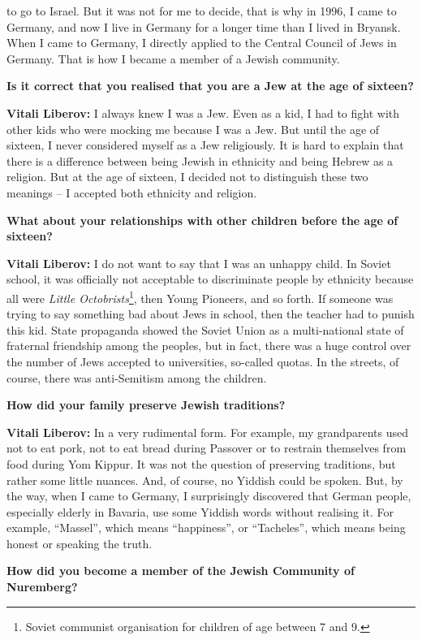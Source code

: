 to go to Israel. But it was not for me to decide, that is why in 1996, I came to Germany, and now I live in Germany for a longer time than I lived in Bryansk. When I came to Germany, I directly applied to the Central Council of Jews in Germany. That is how I became a member of a Jewish community.  

\textbf{Is it correct that you realised that you are a Jew at the age of sixteen?} 

\textbf{Vitali Liberov:} I always knew I was a Jew. Even as a kid, I had to fight with other kids who were mocking me because I was a Jew. But until the age of sixteen, I never considered myself as a Jew religiously. It is hard to explain that there is a difference between being Jewish in ethnicity and being Hebrew as a religion. But at the age of sixteen, I decided not to distinguish these two meanings – I accepted both ethnicity and religion.  

\textbf{What about your relationships with other children before the age of sixteen?} 

\textbf{Vitali Liberov:} I do not want to say that I was an unhappy child. In Soviet school, it was officially not acceptable to discriminate people by ethnicity because all were \textit{Little Octobrists}\footnote{Soviet communist organisation for children of age between 7 and 9.}, then Young Pioneers, and so forth. If someone was trying to say something bad about Jews in school, then the teacher had to punish this kid. State propaganda showed the Soviet Union as a multi-national state of fraternal friendship among the peoples, but in fact, there was a huge control over the number of Jews accepted to universities, so-called quotas. In the streets, of course, there was anti-Semitism among the children.  

\textbf{How did your family preserve Jewish traditions?} 

\textbf{Vitali Liberov:} In a very rudimental form. For example, my grandparents used not to eat pork, not to eat bread during Passover or to restrain themselves from food during Yom Kippur. It was not the question of preserving traditions, but rather some little nuances. And, of course, no Yiddish could be spoken. But, by the way, when I came to Germany, I surprisingly discovered that German people, especially elderly in Bavaria, use some Yiddish words without realising it. For example, ``Massel'', which means ``happiness'', or ``Tacheles'', which means being honest or speaking the truth.  

\textbf{How did you become a member of the Jewish Community of Nuremberg?} 

